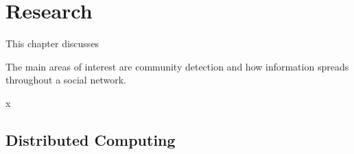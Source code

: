 \chapter{Research}
This chapter discusses 

The main areas of interest are community detection and how information spreads throughout a social network. 


% 
% 
x
% 

\section{Distributed Computing}



